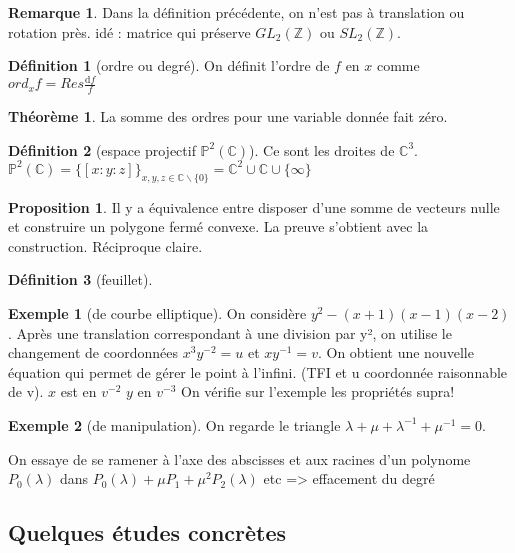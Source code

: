 \documentclass{article}
\newcommand{\C}{\mathbb{C}} %
\newcommand{\Proj}{\mathbb{P}} %
\newcommand{\Z}{\mathbb{Z}} %
\theoremstyle{definition} %
\newtheorem{defi}{Définition}
\newtheorem{rmq}{Remarque}
\newtheorem{thm}{Théorème}
\newtheorem{prop}{Proposition}
\newtheorem{ex}{Exemple}
\newcommand{\dd}{ \mathrm{d}}
\newcommand{\1}{\mathbb{1}} %
\begin{document}
\begin{rmq}
Dans la définition précédente,
on n'est pas à translation ou rotation près.
idé : matrice qui préserve $GL_2(\Z)$ ou $SL_2(\Z)$.
\end{rmq}



\begin{defi}[ordre ou degré]
On définit l'ordre de $f$ en $x$ comme $ord_x f= Res \frac{\dd f}{f}$
\end{defi}

\begin{thm}
La somme des ordres pour une variable donnée fait zéro.
\end{thm}

\begin{defi}[espace projectif $\Proj^2 (\C)$]
Ce sont les droites de $\C^3$.
$\Proj^2 (\C)=\{ [x:y:z] \}_{x,y,z \in \C \backslash \{0\}}=\C^2 \cup \C \cup \{\infty\} $
\end{defi}

\begin{prop}
Il y a équivalence entre disposer d'une somme de vecteurs nulle et construire un polygone fermé convexe.
La preuve s'obtient avec la construction. Réciproque claire.
\end{prop}

\begin{defi}[feuillet]

\end{defi}

\begin{ex}[de courbe elliptique]
On considère $y^2 - (x+1)(x-1)(x-2)$.
Après une translation correspondant à une division par y², on utilise le changement de coordonnées $x^3 y^{-2}= u$ et $xy^{-1}=v$. On obtient une nouvelle équation qui permet de gérer le point à l'infini. (TFI et u coordonnée raisonnable de v).
$x$ est en $v^{-2}$ 
$y$ en $v^{-3}$
On vérifie sur l'exemple les propriétés supra!
\end{ex}

\begin{ex}[de manipulation]
On regarde le triangle $\lambda + \mu + \lambda^{-1} + \mu^{-1} = 0$.
\end{ex}

On essaye de se ramener à l'axe des abscisses et aux racines d'un polynome $P_0(\lambda)$ dans $P_0(\lambda) + \mu P_1 + \mu^2 P_2(\lambda)$ etc
=> effacement du degré

\subsection{Quelques études concrètes}
\end{document}
